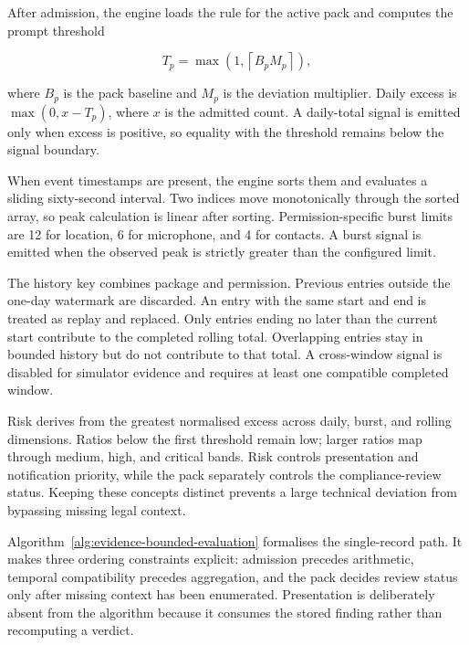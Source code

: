 After admission, the engine loads the rule for the active pack and computes the prompt threshold

\begin{equation}
T_p=\max\left(1,\left\lceil B_pM_p\right\rceil\right),
\end{equation}

where \(B_p\) is the pack baseline and \(M_p\) is the deviation multiplier. Daily excess is \(\max(0,x-T_p)\), where \(x\) is the admitted count. A daily-total signal is emitted only when excess is positive, so equality with the threshold remains below the signal boundary.

When event timestamps are present, the engine sorts them and evaluates a sliding sixty-second interval. Two indices move monotonically through the sorted array, so peak calculation is linear after sorting. Permission-specific burst limits are 12 for location, 6 for microphone, and 4 for contacts. A burst signal is emitted when the observed peak is strictly greater than the configured limit.

The history key combines package and permission. Previous entries outside the one-day watermark are discarded. An entry with the same start and end is treated as replay and replaced. Only entries ending no later than the current start contribute to the completed rolling total. Overlapping entries stay in bounded history but do not contribute to that total. A cross-window signal is disabled for simulator evidence and requires at least one compatible completed window.

Risk derives from the greatest normalised excess across daily, burst, and rolling dimensions. Ratios below the first threshold remain low; larger ratios map through medium, high, and critical bands. Risk controls presentation and notification priority, while the pack separately controls the compliance-review status. Keeping these concepts distinct prevents a large technical deviation from bypassing missing legal context.

Algorithm~\ref{alg:evidence-bounded-evaluation} formalises the single-record path. It makes three ordering constraints explicit: admission precedes arithmetic, temporal compatibility precedes aggregation, and the pack decides review status only after missing context has been enumerated. Presentation is deliberately absent from the algorithm because it consumes the stored finding rather than recomputing a verdict.

